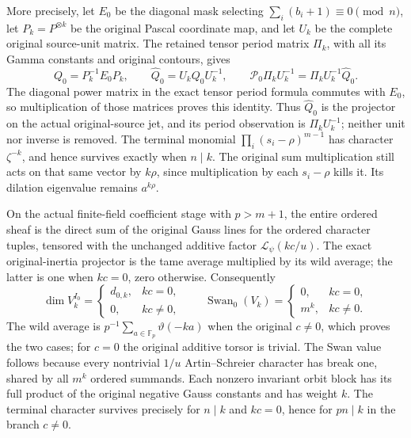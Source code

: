 \documentclass[11pt]{article}
\begin{document}
More precisely, let \(E_0\) be the diagonal mask selecting
\(\sum_i(b_i+1)\equiv0\pmod n\), let
\(P_k=P^{\otimes k}\) be the original Pascal coordinate map,
and let \(U_k\) be the complete original source-unit matrix.
The retained tensor period matrix \(\Pi_k\), with all its
Gamma constants and original contours, gives
\[
 Q_0=P_k^{-1}E_0P_k,\qquad
 \widehat Q_0=U_kQ_0U_k^{-1},\qquad
 \mathcal P_0\Pi_kU_k^{-1}
       =\Pi_kU_k^{-1}\widehat Q_0.
 \tag{SPBT.2}\label{eq:spbt2}
\]
The diagonal power matrix in the exact tensor period formula
commutes with \(E_0\), so multiplication of those matrices
proves this identity.  Thus \(\widehat Q_0\) is the projector
on the actual original-source jet, and its period observation
is \(\Pi_kU_k^{-1}\); neither unit nor inverse is removed.
The terminal monomial \(\prod_i(s_i-\rho)^{m-1}\) has
character \(\zeta^{-k}\), and hence survives exactly when
\(n\mid k\).  The original sum multiplication still acts on
that same vector by \(k\rho\), since multiplication by
each \(s_i-\rho\) kills it.  Its dilation eigenvalue remains
\(a^{k\rho}\).

On the actual finite-field coefficient stage with \(p>m+1\),
the entire ordered sheaf is the direct sum of the original
Gauss lines for the ordered character tuples, tensored with
the unchanged additive factor \(\mathcal L_\psi(kc/u)\).
The exact original-inertia projector is the tame average
multiplied by its wild average; the latter is one when
\(kc=0\), zero otherwise.  Consequently
\[
 \dim V_k^{I_0}=\begin{cases}d_{0,k},&kc=0,\\0,&kc\ne0,
 \end{cases}
 \qquad
 \operatorname{Swan}_0(V_k)=
 \begin{cases}0,&kc=0,\\m^k,&kc\ne0.\end{cases}
 \tag{SPBT.3}\label{eq:spbt3}
\]
The wild average is \(p^{-1}\sum_{a\in\mathbb F_p}
\vartheta(-ka)\) when the original \(c\ne0\), which proves
the two cases; for \(c=0\) the original additive torsor is
trivial.  The Swan value follows because every nontrivial
\(1/u\) Artin--Schreier character has break one, shared by
all \(m^k\) ordered summands.  Each nonzero invariant orbit
block has its full product of the original negative Gauss
constants and has weight \(k\).  The terminal character
survives precisely for \(n\mid k\) and \(kc=0\), hence
for \(pn\mid k\) in the branch \(c\ne0\).
\end{document}
